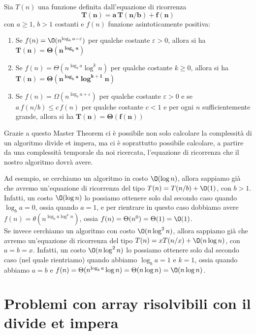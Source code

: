 \documentclass[11pt, a4paper, titlepage, oneside]{scrbook}
\begin{document}
\begin{Definizione}
\label{def-master-theorem}
Sia $T(n)$ una funzione definita dall'equazione di ricorrenza
\[
\bm{T(n) = a \, T(n/b) + f(n)}
\]
con $a \geq 1$, $b > 1$ costanti e $f(n)$ funzione asintoticamente positiva:
\begin{enumerate}
    \item Se $f(n) = \O(n^{\log_b a - \varepsilon})$ per qualche costante $\varepsilon > 0$, allora si ha $\bm{T(n) = \Theta(n^{\log_b a})}$
    \item Se $f(n) = \Theta(n^{\log_b a} \log^k n)$ per qualche costante $k \geq 0$, allora si ha \mbox{$\bm{T(n) = \Theta(n^{\log_b a} \log^{k+1} n)}$}
    \item Se $f(n) = \Omega(n^{\log_b a + \varepsilon})$ per qualche costante $\varepsilon > 0$ e se $a \, f(n/b) \leq c \, f(n)$ per qualche costante $c < 1$ e per ogni $n$ sufficientemente grande, allora si ha $\bm{T(n) = \Theta(f(n))}$
\end{enumerate}
\end{Definizione}

Grazie a questo Master Theorem ci è possibile non solo calcolare la complessità di un algoritmo divide et impera, ma ci è soprattutto possibile calcolare, a partire da una complessità temporale da noi ricercata, l'equazione di ricorrenza che il nostro algoritmo dovrà avere. 

Ad esempio, se cerchiamo un algoritmo in costo $\O(\log n)$, allora sappiamo già che avremo un'equazione di ricorrenza del tipo $T(n) = T(n/b) + \O(1)$, con $b > 1$. Infatti, un costo $\O(\log n)$ lo possiamo ottenere solo dal secondo caso quando $\log_b a = 0$, ossia quando $a = 1$, e per rientrare in questo caso dobbiamo avere $f(n) = \theta(n^{\log_b a \log^k n})$, ossia $f(n) = \Theta(n^0) = \Theta(1) = \O(1)$. \\
Se invece cerchiamo un algoritmo con costo $\O(n \log^2 n)$, allora sappiamo già che avremo un'equazione di ricorrenza del tipo $T(n) = x T(n/x) + \O(n\log n)$, con $a = b = x$. Infatti, un costo $\O(n \log^2 n)$ lo possiamo ottenere solo dal secondo caso (nel quale rientriamo) quando abbiamo $\log_b a = 1$ e $k = 1$, ossia quando abbiamo $a = b$ e \mbox{$f(n) = \Theta(n^{\log_b a} \log n) = \Theta(n \log n) = \O(n \log n)$}. 

\section{Problemi con array risolvibili con il divide et impera}
\end{document}
